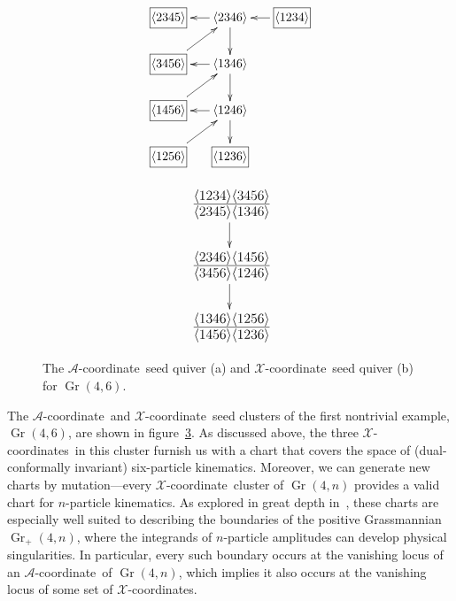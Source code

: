 \documentclass[11pt]{article}
\DeclareMathOperator{\Gr}{Gr}
\def\ket#1{\langle #1 \rangle}
\def\xcoord{$\mathcal{X}$-coordinate}
\def\xcoords{$\mathcal{X}$-coordinates}
\def\acoord{$\mathcal{A}$-coordinate}
\begin{document}
\begin{figure}[t]
\centering
\begin{subfigure}[b]{0.45\textwidth}
\begin{equation*}
\begin{gathered}
\begin{xy} 0;<-.5pt,0pt>:<0pt,-.5pt>::
         (-100,0) *+{\framebox[7ex]{$\ket{1234}$}} ="0",
	(0,0) *+{\ket{2346}} ="1",
	(100,0) *+{\framebox[7ex]{$\ket{2345}$}} ="2",
	(0,75) *+{\ket{1346}} ="3",
	(100,75) *+{\framebox[7ex]{$\ket{3456}$}} ="4",
	(0,150) *+{\ket{1246}} ="5",
	(100,150) *+{\framebox[7ex]{$\ket{1456}$}} ="6",
	(0,225) *+{\framebox[7ex]{$\ket{1236}$}} ="7",
	(100,225) *+{\framebox[7ex]{$\ket{1256}$}} ="8",
	"0", {\ar"1"},
	"1", {\ar"2"},
	"3", {\ar"4"},
	"5", {\ar"6"},
	"1", {\ar"3"},
	"3", {\ar"5"},
	"5", {\ar"7"},
	"4", {\ar"1"},
	"6", {\ar"3"},
	"8", {\ar"5"},
\end{xy}
\end{gathered} 
\end{equation*}
\caption{} \label{fig:g46-a-seed}
\end{subfigure}
\hspace*{\fill} 
\begin{subfigure}[b]{0.45\textwidth}
\begin{equation*}
\begin{gathered}
\begin{xy} 0;<-.5pt,0pt>:<0pt,-.5pt>::
	(0,0) *+\txt{\fontsize{16pt}{16pt} $\frac{\ket{1234}\ket{3456}}{\ket{2345}\ket{1346}}$} ="1",
	(0,100) *+\txt{\fontsize{16pt}{16pt} $\frac{\ket{2346}\ket{1456}}{\ket{3456}\ket{1246}}$} ="3",
	(0,200) *+\txt{\fontsize{16pt}{16pt} $\frac{\ket{1346}\ket{1256}}{\ket{1456}\ket{1236}}$} ="5",
	"1", {\ar"3"},
	"3", {\ar"5"},
\end{xy}
\end{gathered} 
\end{equation*}
\caption{} \label{fig:g46-x-seed}
\end{subfigure}
\caption{The \acoord\ seed quiver (a) and \xcoord\ seed quiver (b) for $\Gr(4,6)$.} 
\label{fig:g46-seed}
\end{figure}

The \acoord\ and \xcoord\ seed clusters of the first nontrivial example, $\Gr(4,6)$, are shown in figure~\ref{fig:g46-seed}. As discussed above, the three \xcoords\ in this cluster furnish us with a chart that covers the space of (dual-conformally invariant) six-particle kinematics. Moreover, we can generate new charts by mutation---every \xcoord\ cluster of $\Gr(4,n)$ provides a valid chart for $n$-particle kinematics. As explored in great depth in~\cite{ArkaniHamed:2012nw}, these charts are especially well suited to describing the boundaries of the positive Grassmannian $\Gr_+(4,n)$, where the integrands of $n$-particle amplitudes can develop physical singularities. In particular, every such boundary occurs at the vanishing locus of an \acoord\ of $\Gr(4,n)$, which implies it also occurs at the vanishing locus of some set of \xcoords.  
\end{document}
